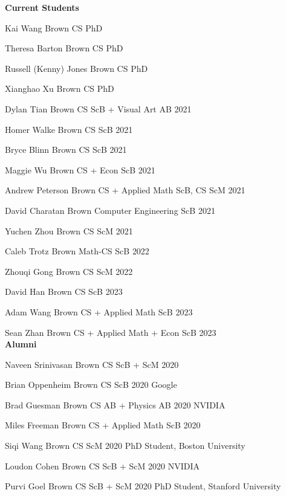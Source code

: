 \documentclass[line,margin]{res}
\begin{document}
\begin{resume}
\newcommand{\visitor}[4] {
	#1 \hfill #2 #3\\
	\emph{Home institution: #4}
}


\textbf{Current Students}

\currentphd
{Kai Wang}
{Brown CS PhD}

\currentphd
{Theresa Barton}
{Brown CS PhD}

\currentphd
{Russell (Kenny) Jones}
{Brown CS PhD}

\currentphd
{Xianghao Xu}
{Brown CS PhD}

\student
{Dylan Tian}
{Brown CS ScB + Visual Art AB}
{2021}

\student
{Homer Walke}
{Brown CS ScB}
{2021}

\student
{Bryce Blinn}
{Brown CS ScB}
{2021}	

\student
{Maggie Wu}
{Brown CS + Econ ScB}
{2021}

\student
{Andrew Peterson}
{Brown CS + Applied Math ScB, CS ScM}
{2021}

\student
{David Charatan}
{Brown Computer Engineering ScB}
{2021}

\student
{Yuchen Zhou}
{Brown CS ScM}
{2021}

\student
{Caleb Trotz}
{Brown Math-CS ScB}
{2022}

\student
{Zhouqi Gong}
{Brown CS ScM}
{2022}

\student
{David Han}
{Brown CS ScB}
{2023}

\student
{Adam Wang}
{Brown CS + Applied Math ScB}
{2023}

\student
{Sean Zhan}
{Brown CS + Applied Math + Econ ScB}
{2023}
\\


\textbf{Alumni}

\alumni
{Naveen Srinivasan}
{Brown CS ScB + ScM}
{2020}
{}

\alumni
{Brian Oppenheim}
{Brown CS ScB}
{2020}
{Google}

\alumni
{Brad Guesman}
{Brown CS AB + Physics AB}
{2020}
{NVIDIA}

\alumni
{Miles Freeman}
{Brown CS + Applied Math ScB}
{2020}
{}

\alumni
{Siqi Wang}
{Brown CS ScM}
{2020}
{PhD Student, Boston University}

\alumni
{Loudon Cohen}
{Brown CS ScB + ScM}
{2020}
{NVIDIA}

\alumni
{Purvi Goel}
{Brown CS ScB + ScM}
{2020}
{PhD Student, Stanford University}


\end{resume}
\end{document}
